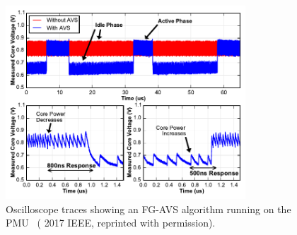 \documentclass[graybox]{svmult}
\begin{document}
\begin{figure}
  \centering
  \includegraphics[width=0.8\textwidth]{6-raven4-avs}
  \caption{Oscilloscope traces showing an FG-AVS algorithm running on the PMU~\cite{Keller2017} ({\textcopyright} 2017 IEEE, reprinted with permission).}
  \label{fig:6-raven4-avs}
\end{figure}
\end{document}

